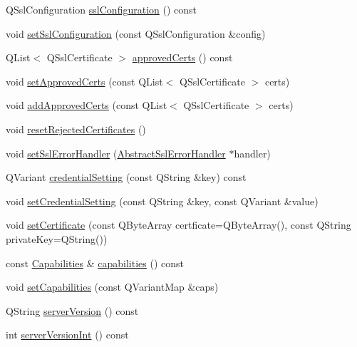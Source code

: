 \begin{DoxyCompactItemize}
Q\+Ssl\+Configuration \hyperlink{class_o_c_c_1_1_account_aab78889837ce507c78a70dc19fa743b2}{ssl\+Configuration} () const
\item 
void \hyperlink{class_o_c_c_1_1_account_ad2c51818f832c9f29ee900bc34c174f3}{set\+Ssl\+Configuration} (const Q\+Ssl\+Configuration \&config)
\item 
Q\+List$<$ Q\+Ssl\+Certificate $>$ \hyperlink{class_o_c_c_1_1_account_adb8056c3385558bfece709bf94d80f8d}{approved\+Certs} () const
\item 
void \hyperlink{class_o_c_c_1_1_account_aa83e4e04f4c111ad1f4f705dcb091463}{set\+Approved\+Certs} (const Q\+List$<$ Q\+Ssl\+Certificate $>$ certs)
\item 
void \hyperlink{class_o_c_c_1_1_account_a80837c6004248f98a0ee518b416c7680}{add\+Approved\+Certs} (const Q\+List$<$ Q\+Ssl\+Certificate $>$ certs)
\item 
void \hyperlink{class_o_c_c_1_1_account_a50c8e4545dca3f4e7697914f8e23af02}{reset\+Rejected\+Certificates} ()
\item 
void \hyperlink{class_o_c_c_1_1_account_a19cd9fde665641af80c06c45a5dad5e1}{set\+Ssl\+Error\+Handler} (\hyperlink{class_o_c_c_1_1_abstract_ssl_error_handler}{Abstract\+Ssl\+Error\+Handler} $\ast$handler)
\item 
Q\+Variant \hyperlink{class_o_c_c_1_1_account_a229c4435821c7e548ca2f41d25830bb0}{credential\+Setting} (const Q\+String \&key) const
\item 
void \hyperlink{class_o_c_c_1_1_account_a2404d26ca666239e2b32d318e24ded02}{set\+Credential\+Setting} (const Q\+String \&key, const Q\+Variant \&value)
\item 
void \hyperlink{class_o_c_c_1_1_account_a91c63e470093cf6e7be3394e0dce1190}{set\+Certificate} (const Q\+Byte\+Array certficate=Q\+Byte\+Array(), const Q\+String private\+Key=Q\+String())
\item 
const \hyperlink{class_o_c_c_1_1_capabilities}{Capabilities} \& \hyperlink{class_o_c_c_1_1_account_a98fd2ff15c9ecb93fcf2f75441d05037}{capabilities} () const
\item 
void \hyperlink{class_o_c_c_1_1_account_ad17669a040e71724454368bcf6516677}{set\+Capabilities} (const Q\+Variant\+Map \&caps)
\item 
Q\+String \hyperlink{class_o_c_c_1_1_account_a8d123288d50c28967ad1646636d3d5aa}{server\+Version} () const
\item 
int \hyperlink{class_o_c_c_1_1_account_a119584b3a4f05a182c2ca6e761956b44}{server\+Version\+Int} () const
\item 

\end{DoxyCompactItemize}
